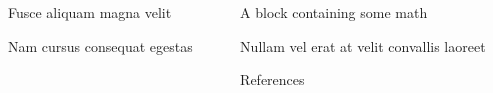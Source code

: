 \documentclass[final]{beamer}
\newlength{\sepwidth}
\newlength{\colwidth}
\newcommand{\separatorcolumn}{\begin{column}{\sepwidth}\end{column}}
\begin{document}
\begin{frame}[t]
\begin{columns}[t]
\begin{column}{\colwidth}
\begin{block}{Fusce aliquam magna velit}
  \end{block}

  \begin{block}{Nam cursus consequat egestas}

  \end{block}

\end{column}

\separatorcolumn

\begin{column}{\colwidth}

  \begin{block}{A block containing some math}

  \end{block}

  \begin{block}{Nullam vel erat at velit convallis laoreet}

  \end{block}

  \begin{block}{References}

    \nocite{*}
    \footnotesize{}

  \end{block}

\end{column}

\separatorcolumn
\end{columns}
\end{frame}
\end{document}
